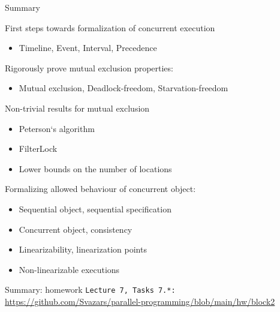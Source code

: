 \begin{frame}{Summary}

First steps towards formalization of concurrent execution
\begin{itemize}
  \item Timeline, Event, Interval, Precedence
\end{itemize}

Rigorously prove mutual exclusion properties:
\begin{itemize}
  \item Mutual exclusion, Deadlock-freedom, Starvation-freedom
\end{itemize}

Non-trivial results for mutual exclusion
\begin{itemize}
  \item Peterson`s algorithm
  \item FilterLock
  \item Lower bounds on the number of locations
\end{itemize}

Formalizing allowed behaviour of concurrent object:
\begin{itemize}
  \item Sequential object, sequential specification
  \item Concurrent object, consistency
  \item Linearizability, linearization points
  \item Non-linearizable executions
\end{itemize}
\end{frame}

\begin{frame}{Summary: homework}
    \texttt{Lecture 7, Tasks 7.*:} {\tiny\url{https://github.com/Svazars/parallel-programming/blob/main/hw/block2}}
\end{frame}



